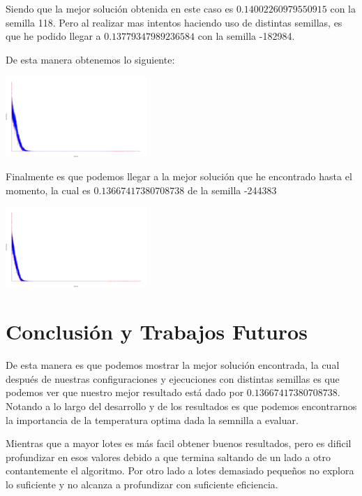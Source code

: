 \begin{multicols}{2}
Siendo que la mejor solución obtenida en este caso es $0.14002260979550915$ con la semilla 118. Pero al realizar mas intentos haciendo uso de distintas semillas, es que he podido llegar a $0.13779347989236584$ con la semilla -182984. 

De esta manera obtenemos lo siguiente:

\begin{center}
  \includegraphics[width=0.4\textwidth]{../svgs/Mejor_150_semilla_-182984.pdf}
\end{center}

Finalmente es que podemos llegar a la mejor solución que he encontrado hasta el momento, la cual es $0.13667417380708738$ de la semilla -244383  

\begin{center}
  \includegraphics[width=0.4\textwidth]{../svgs/Mejor_150_semilla_-244383.pdf}
\end{center}


\section{Conclusión y Trabajos Futuros}

De esta manera es que podemos mostrar la mejor solución encontrada, la cual después de nuestras configuraciones y ejecuciones con distintas semillas es que podemos ver que nuestro mejor resultado está dado por $0.13667417380708738$. Notando a lo largo del desarrollo y de los resultados es que podemos encontrarnos la importancia de la temperatura optima dada la semnilla a evaluar.

Mientras que a mayor lotes es más facil obtener buenos resultados, pero es dificil profundizar en esos valores debido a que termina saltando de un lado a otro contantemente el algoritmo. Por otro lado a lotes demasiado pequeños no explora lo suficiente y no alcanza a profundizar con suficiente eficiencia.


\end{multicols}
